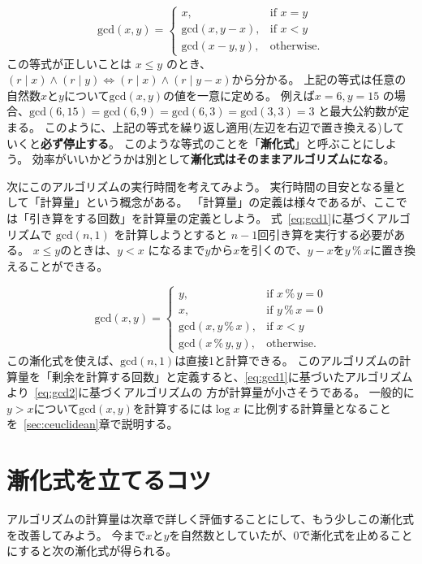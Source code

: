 \documentclass[a4paper,oneside,onecolumn,openany,article,10pt]{memoir}
\theoremstyle{remark}
\begin{document}
\begin{equation}
\mathrm{gcd}(x, y) =
\begin{cases}
x,& \text{if } x = y\\
\mathrm{gcd}(x, y-x),& \text{if } x < y\\
\mathrm{gcd}(x-y, y),& \text{otherwise.}
\end{cases}
\label{eq:gcd1}
\end{equation}
この等式が正しいことは $x\le y$ のとき、$(r\mid x) \land (r\mid y) \iff (r\mid x) \land (r\mid y-x)$から分かる。
上記の等式は任意の自然数$x$と$y$について$\mathrm{gcd}(x, y)$の値を一意に定める。
例えば$x=6, y=15$ の場合、$\mathrm{gcd}(6, 15) = \mathrm{gcd}(6, 9) = \mathrm{gcd}(6, 3) = \mathrm{gcd}(3, 3) = 3$ と最大公約数が定まる。
このように、上記の等式を繰り返し適用(左辺を右辺で置き換える)していくと\textbf{必ず停止する}。
このような等式のことを「\textbf{漸化式}」と呼ぶことにしよう。
効率がいいかどうかは別として\textbf{漸化式はそのままアルゴリズムになる}。

次にこのアルゴリズムの実行時間を考えてみよう。
実行時間の目安となる量として「計算量」という概念がある。
「計算量」の定義は様々であるが、ここでは「引き算をする回数」を計算量の定義としよう。
式~\eqref{eq:gcd1}に基づくアルゴリズムで $\mathrm{gcd}(n, 1)$ を計算しようとすると $n-1$回引き算を実行する必要がある。
$x\le y$のときは、$y < x$ になるまで$y$から$x$を引くので、$y-x$を$y\,\%\,x$に置き換えることができる。

\begin{equation}
\mathrm{gcd}(x, y) =
\begin{cases}
y,& \text{if } x \,\%\, y = 0\\
x,& \text{if } y \,\%\, x = 0\\
\mathrm{gcd}(x, y\, \%\, x),& \text{if } x< y\\
\mathrm{gcd}(x\, \%\, y, y),& \text{otherwise.}
\end{cases}
\label{eq:gcd2}
\end{equation}
この漸化式を使えば、$\mathrm{gcd}(n,1)$は直接1と計算できる。
このアルゴリズムの計算量を「剰余を計算する回数」と定義すると、\eqref{eq:gcd1}に基づいたアルゴリズムより~\eqref{eq:gcd2}に基づくアルゴリズムの
方が計算量が小さそうである。
一般的に$y>x$について$\mathrm{gcd}(x, y)$を計算するには$\log x$ に比例する計算量となることを~\ref{sec:ceuclidean}章で説明する。

\section{漸化式を立てるコツ}
アルゴリズムの計算量は次章で詳しく評価することにして、もう少しこの漸化式を改善してみよう。
今まで$x$と$y$を自然数としていたが、0で漸化式を止めることにすると次の漸化式が得られる。
\end{document}
